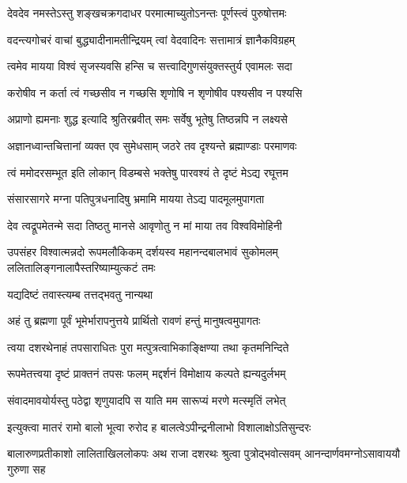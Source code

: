 
\twolineshloka
{देवदेव नमस्तेऽस्तु शङ्खचक्रगदाधर}
{परमात्माच्युतोऽनन्तः पूर्णस्त्वं पुरुषोत्तमः} %

\twolineshloka
{वदन्त्यगोचरं वाचां बुद्ध्यादीनामतीन्द्रियम्}
{त्वां वेदवादिनः सत्तामात्रं ज्ञानैकविग्रहम्} %

\twolineshloka
{त्वमेव मायया विश्वं सृजस्यवसि हन्सि च}
{सत्त्वादिगुणसंयुक्तस्तुर्य एवामलः सदा} %

\twolineshloka
{करोषीव न कर्ता त्वं गच्छसीव न गच्छसि}
{शृणोषि न शृणोषीव पश्यसीव न पश्यसि} %

\twolineshloka
{अप्राणो ह्यमनाः शुद्ध इत्यादि श्रुतिरब्रवीत्}
{समः सर्वेषु भूतेषु तिष्ठन्नपि न लक्ष्यसे} %

\twolineshloka
{अज्ञानध्वान्तचित्तानां व्यक्त एव सुमेधसाम्}
{जठरे तव दृश्यन्ते ब्रह्माण्डाः परमाणवः} %

\twolineshloka
{त्वं ममोदरसम्भूत इति लोकान् विडम्बसे}
{भक्तेषु पारवश्यं ते दृष्टं मेऽद्य रघूत्तम} %

\twolineshloka
{संसारसागरे मग्ना पतिपुत्रधनादिषु}
{भ्रमामि मायया तेऽद्य पादमूलमुपागता} %

\twolineshloka
{देव त्वद्रूपमेतन्मे सदा तिष्ठतु मानसे}
{आवृणोतु न मां माया तव विश्वविमोहिनी} %

\threelineshloka
{उपसंहर विश्वात्मन्नदो रूपमलौकिकम्}
{दर्शयस्व महानन्दबालभावं सुकोमलम्}
{ललितालिङ्गनालापैस्तरिष्याम्युत्कटं तमः} %


\onelineshloka
{यद्यदिष्टं तवास्त्यम्ब तत्तद्भवतु नान्यथा} %

\twolineshloka
{अहं तु ब्रह्मणा पूर्वं भूमेर्भारापनुत्तये}
{प्रार्थितो रावणं हन्तुं मानुषत्वमुपागतः} %

\twolineshloka
{त्वया दशरथेनाहं तपसाराधितः पुरा}
{मत्पुत्रत्वाभिकाङ्क्षिण्या तथा कृतमनिन्दिते} %

\twolineshloka
{रूपमेतत्त्वया दृष्टं प्राक्तनं तपसः फलम्}
{मद्दर्शनं विमोक्षाय कल्पते ह्यन्यदुर्लभम्} %

\twolineshloka
{संवादमावयोर्यस्तु पठेद्वा शृणुयादपि}
{स याति मम सारूप्यं मरणे मत्स्मृतिं लभेत्} %

\twolineshloka
{इत्युक्त्वा मातरं रामो बालो भूत्वा रुरोद ह}
{बालत्वेऽपीन्द्रनीलाभो विशालाक्षोऽतिसुन्दरः} %

\threelineshloka
{बालारुणप्रतीकाशो लालिताखिललोकपः}
{अथ राजा दशरथः श्रुत्वा पुत्रोद्भवोत्सवम्}
{आनन्दार्णवमग्नोऽसावाययौ गुरुणा सह} %

